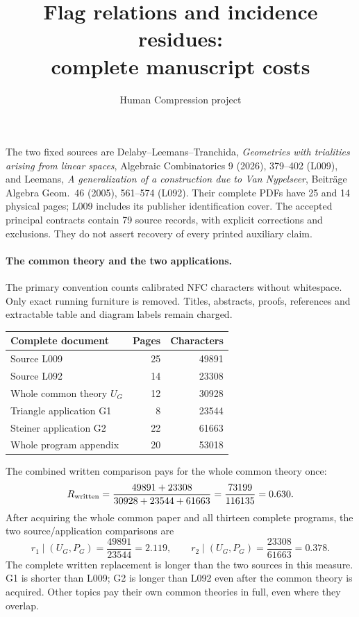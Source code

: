 \documentclass[11pt,a4paper]{article}
\title{Flag relations and incidence residues:\\complete manuscript costs}
\author{Human Compression project}\date{}
\begin{document}
\maketitle
The two fixed sources are Delaby--Leemans--Tranchida, \emph{Geometries with
trialities arising from linear spaces}, Algebraic Combinatorics 9 (2026),
379--402 (L009), and Leemans, \emph{A generalization of a construction due
to Van Nypelseer}, Beitr\"age Algebra Geom.\ 46 (2005), 561--574 (L092).
Their complete PDFs have 25 and 14 physical pages; L009 includes its
publisher identification cover. The accepted principal contracts contain
79 source records, with explicit corrections and exclusions. They do not
assert recovery of every printed auxiliary claim.

\paragraph{The common theory and the two applications.}
The primary convention counts calibrated NFC characters without whitespace.
Only exact running furniture is removed. Titles, abstracts, proofs,
references and extractable table and diagram labels remain charged.
\begin{center}\begin{tabular}{lrr}\toprule
Complete document & Pages & Characters\\\midrule
Source L009 & 25 & 49891\\
Source L092 & 14 & 23308\\
Whole common theory $U_G$ & 12 & 30928\\
Triangle application G1 & 8 & 23544\\
Steiner application G2 & 22 & 61663\\
Whole program appendix & 20 & 53018\\\bottomrule
\end{tabular}\end{center}
The combined written comparison pays for the whole common theory once:
\[
 R_{\rm written}=\frac{49891+23308}{30928+23544+61663}
 =\frac{73199}{116135}=0.630.
\]
After acquiring the whole common paper and all thirteen complete programs,
the two source/application comparisons are
\[
 r_1\mid(U_G,P_G)=\frac{49891}{23544}=2.119,\qquad
 r_2\mid(U_G,P_G)=\frac{23308}{61663}=0.378.
\]
The complete written replacement is longer than the two sources in this
measure. G1 is shorter than L009; G2 is longer than L092 even after the
common theory is acquired. Other topics pay their own common theories in
full, even where they overlap.
\end{document}
